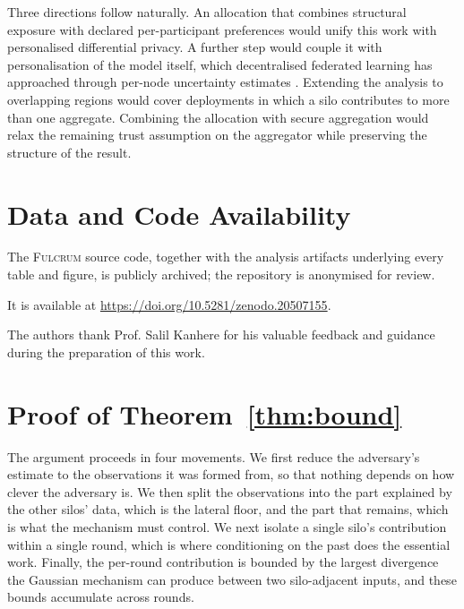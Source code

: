 \documentclass[acmsmall,screen,review,anonymous]{acmart}
\theoremstyle{acmdefinition}%
\newcommand{\Fulcrum}{\textsc{Fulcrum}\xspace}
\begin{document}
Three directions follow naturally. An allocation that combines structural
exposure with declared per-participant preferences would unify this work with
personalised differential privacy. A further step would couple it with
personalisation of the model itself, which decentralised federated learning has
approached through per-node uncertainty estimates
\cite{rangwala2026evidential}. Extending the analysis to overlapping regions
would cover deployments in which a silo contributes to more than one aggregate.
Combining the allocation with secure aggregation would relax the remaining trust
assumption on the aggregator while preserving the structure of the result.

\section*{Data and Code Availability}

The \Fulcrum source code, together with the analysis artifacts underlying every
table and figure, is publicly archived; the repository is anonymised for review.
\begin{anonsuppress}
It is available at \url{https://doi.org/10.5281/zenodo.20507155}.
\end{anonsuppress}

\begin{acks}
The authors thank Prof. Salil Kanhere for his valuable feedback and guidance
during the preparation of this work.
\end{acks}




\appendix

\section{Proof of Theorem~\ref{thm:bound}}
\label{app:bound}

The argument proceeds in four movements. We first reduce the adversary's estimate
to the observations it was formed from, so that nothing depends on how clever the
adversary is. We then split the observations into the part explained by the other
silos' data, which is the lateral floor, and the part that remains, which is what
the mechanism must control. We next isolate a single silo's contribution within a
single round, which is where conditioning on the past does the essential work.
Finally, the per-round contribution is bounded by the largest divergence the
Gaussian mechanism can produce between two silo-adjacent inputs, and these bounds
accumulate across rounds.
\end{document}
